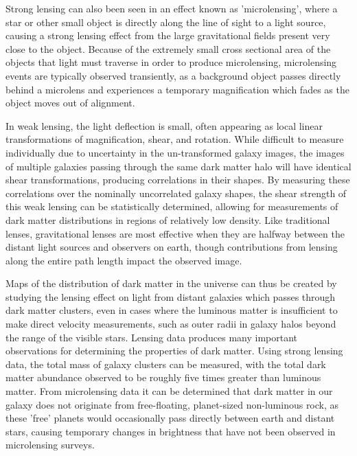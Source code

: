 Strong lensing can also been seen in an effect known as 'microlensing', where a star or other small object is directly along the line of sight to a light source, causing a strong lensing effect from the large gravitational fields present very close to the object.
Because of the extremely small cross sectional area of the objects that light must traverse in order to produce microlensing, microlensing events are typically observed transiently, as a background object passes directly behind a microlens and experiences a temporary magnification which fades as the object moves out of alignment. 

In weak lensing, the light deflection is small, often appearing as local linear transformations of magnification, shear, and rotation. 
While difficult to measure individually due to uncertainty in the un-transformed galaxy images, the images of multiple galaxies passing through the same dark matter halo will have identical shear transformations, producing correlations in their shapes.
By measuring these correlations over the nominally uncorrelated galaxy shapes, the shear strength of this weak lensing can be statistically determined, allowing for measurements of dark matter distributions in regions of relatively low density.
Like traditional lenses, gravitational lenses are most effective when they are halfway between the distant light sources and observers on earth, though contributions from lensing along the entire path length impact the observed image.

Maps of the distribution of dark matter in the universe can thus be created by studying the lensing effect on light from distant galaxies which passes through dark matter clusters, even in cases where the luminous matter is insufficient to make direct velocity measurements, such as outer radii in galaxy halos beyond the range of the visible stars.
Lensing data produces many important observations for determining the properties of dark matter.
Using strong lensing data, the total mass of galaxy clusters can be measured, with the total dark matter abundance observed to be roughly five times greater than luminous matter.
From microlensing data it can be determined that dark matter in our galaxy does not originate from free-floating, planet-sized non-luminous rock, as these 'free' planets would occasionally pass directly between earth and distant stars, causing temporary changes in brightness that have not been observed in microlensing surveys.

